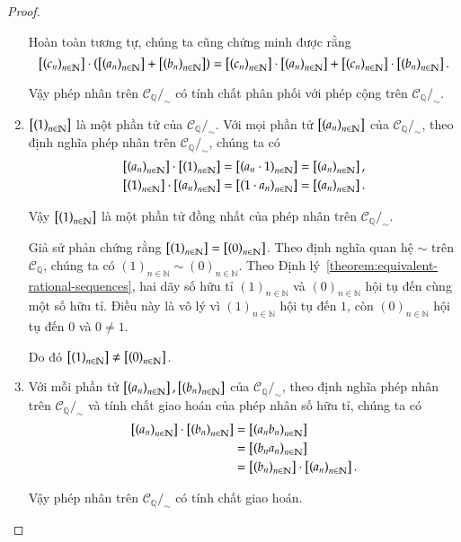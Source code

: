 \begin{proof}
\begin{enumerate}[label=(\roman*)]
              Hoàn toàn tương tự, chúng ta cũng chứng minh được rằng
              \[
                  \left[{\left({c_{n}}\right)}_{{n}\in\mathbb{N}}\right]\cdot \left(\left[{\left({a_{n}}\right)}_{{n}\in\mathbb{N}}\right] + \left[{\left({b_{n}}\right)}_{{n}\in\mathbb{N}}\right]\right) = \left[{\left({c_{n}}\right)}_{{n}\in\mathbb{N}}\right] \cdot \left[{\left({a_{n}}\right)}_{{n}\in\mathbb{N}}\right] + \left[{\left({c_{n}}\right)}_{{n}\in\mathbb{N}}\right] \cdot \left[{\left({b_{n}}\right)}_{{n}\in\mathbb{N}}\right].
              \]

              Vậy phép nhân trên $\mathscr{C}_{\mathbb{Q}}/_{\sim}$ có tính chất phân phối với phép cộng trên $\mathscr{C}_{\mathbb{Q}}/_{\sim}$.
        \item $\left[{\left({1}\right)}_{{n}\in\mathbb{N}}\right]$ là một phần tử của $\mathscr{C}_{\mathbb{Q}}/_{\sim}$. Với mọi phần tử $\left[{\left({a_{n}}\right)}_{{n}\in\mathbb{N}}\right]$ của $\mathscr{C}_{\mathbb{Q}}/_{\sim}$, theo định nghĩa phép nhân trên $\mathscr{C}_{\mathbb{Q}}/_{\sim}$, chúng ta có
              \begin{align*}
                  \left[{\left({a_{n}}\right)}_{{n}\in\mathbb{N}}\right]\cdot \left[{\left({1}\right)}_{{n}\in\mathbb{N}}\right] & = \left[{\left({a_{n}\cdot 1}\right)}_{{n}\in\mathbb{N}}\right] = \left[{\left({a_{n}}\right)}_{{n}\in\mathbb{N}}\right], \\
                  \left[{\left({1}\right)}_{{n}\in\mathbb{N}}\right]\cdot \left[{\left({a_{n}}\right)}_{{n}\in\mathbb{N}}\right] & = \left[{\left({1\cdot a_{n}}\right)}_{{n}\in\mathbb{N}}\right] = \left[{\left({a_{n}}\right)}_{{n}\in\mathbb{N}}\right].
              \end{align*}

              Vậy $\left[{\left({1}\right)}_{{n}\in\mathbb{N}}\right]$ là một phần tử đồng nhất của phép nhân trên $\mathscr{C}_{\mathbb{Q}}/_{\sim}$.

              Giả sử phản chứng rằng $\left[{\left({1}\right)}_{{n}\in\mathbb{N}}\right] = \left[{\left({0}\right)}_{{n}\in\mathbb{N}}\right]$. Theo định nghĩa quan hệ $\sim$ trên $\mathscr{C}_{\mathbb{Q}}$, chúng ta có ${(1)}_{n\in\mathbb{N}} \sim {(0)}_{n\in\mathbb{N}}$. Theo Định lý~\ref{theorem:equivalent-rational-sequences}, hai dãy số hữu tỉ ${(1)}_{n\in\mathbb{N}}$ và ${(0)}_{n\in\mathbb{N}}$ hội tụ đến cùng một số hữu tỉ. Điều này là vô lý vì ${(1)}_{n\in\mathbb{N}}$ hội tụ đến $1$, còn ${(0)}_{n\in\mathbb{N}}$ hội tụ đến $0$ và $0\ne 1$.

              Do đó $\left[{\left({1}\right)}_{{n}\in\mathbb{N}}\right]\ne \left[{\left({0}\right)}_{{n}\in\mathbb{N}}\right]$.
        \item Với mỗi phần tử $\left[{\left({a_{n}}\right)}_{{n}\in\mathbb{N}}\right], \left[{\left({b_{n}}\right)}_{{n}\in\mathbb{N}}\right]$ của $\mathscr{C}_{\mathbb{Q}}/_{\sim}$, theo định nghĩa phép nhân trên $\mathscr{C}_{\mathbb{Q}}/_{\sim}$ và tính chất giao hoán của phép nhân số hữu tỉ, chúng ta có
              \begin{align*}
                  \left[{\left({a_{n}}\right)}_{{n}\in\mathbb{N}}\right] \cdot \left[{\left({b_{n}}\right)}_{{n}\in\mathbb{N}}\right] & = \left[{\left({a_{n}b_{n}}\right)}_{{n}\in\mathbb{N}}\right]                     \\
                                                            & = \left[{\left({b_{n}a_{n}}\right)}_{{n}\in\mathbb{N}}\right]                     \\
                                                            & = \left[{\left({b_{n}}\right)}_{{n}\in\mathbb{N}}\right] \cdot \left[{\left({a_{n}}\right)}_{{n}\in\mathbb{N}}\right].
              \end{align*}

              Vậy phép nhân trên $\mathscr{C}_{\mathbb{Q}}/_{\sim}$ có tính chất giao hoán.
    \end{enumerate}
\end{proof}

